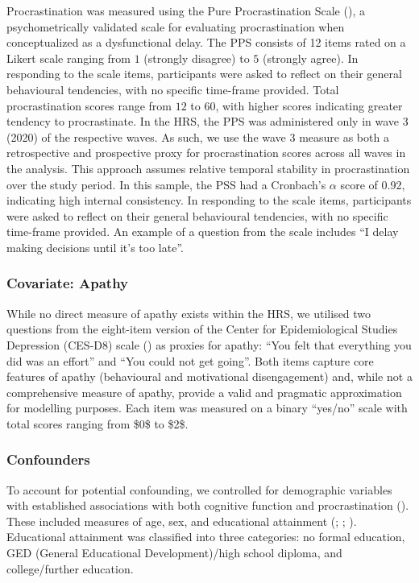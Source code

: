 \documentclass[
]{article}
\begin{document}
Procrastination was measured using the Pure Procrastination Scale
(), a psychometrically validated
scale for evaluating procrastination when conceptualized as a
dysfunctional delay. The PPS consists of 12 items rated on a Likert
scale ranging from \(1\) (strongly disagree) to \(5\) (strongly agree).
In responding to the scale items, participants were asked to reflect on
their general behavioural tendencies, with no specific time-frame
provided. Total procrastination scores range from \(12\) to \(60\), with
higher scores indicating greater tendency to procrastinate. In the HRS,
the PPS was administered only in wave 3 (2020) of the respective waves.
As such, we use the wave 3 measure as both a retrospective and
prospective proxy for procrastination scores across all waves in the
analysis. This approach assumes relative temporal stability in
procrastination over the study period. In this sample, the PSS had a
Cronbach's \(\alpha\) score of 0.92, indicating high internal
consistency. In responding to the scale items, participants were asked
to reflect on their general behavioural tendencies, with no specific
time-frame provided. An example of a question from the scale includes
``I delay making decisions until it's too late''.

\subsubsection{Covariate: Apathy}\label{covariate-apathy}

While no direct measure of apathy exists within the HRS, we utilised two
questions from the eight-item version of the Center for Epidemiological
Studies Depression (CES-D8) scale () as proxies for apathy: ``You felt that everything you did
was an effort'' and ``You could not get going''. Both items capture core
features of apathy (behavioural and motivational disengagement) and,
while not a comprehensive measure of apathy, provide a valid and
pragmatic approximation for modelling purposes. Each item was measured
on a binary ``yes/no'' scale with total scores ranging from \$0\$ to
\$2\$.

\subsubsection{Confounders}\label{confounders}

To account for potential confounding, we controlled for demographic
variables with established associations with both cognitive function and
procrastination ().
These included measures of age, sex, and educational attainment
(;
;
). Educational attainment was
classified into three categories: no formal education, GED (General
Educational Development)/high school diploma, and college/further
education.
\end{document}
